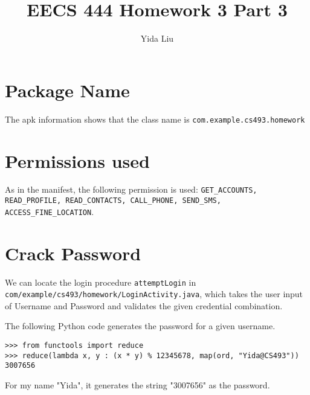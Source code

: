 \documentclass[11pt]{article}
\begin{document}
\author{Yida Liu}
\title{EECS 444 Homework 3 Part 3}
\maketitle


\section{Package Name}

The apk information shows that the class name is \lstinline{com.example.cs493.homework}

\section{Permissions used}

As in the manifest, the following permission is used: \lstinline{GET_ACCOUNTS, READ_PROFILE, READ_CONTACTS, CALL_PHONE, SEND_SMS, ACCESS_FINE_LOCATION}.

\section{Crack Password}

We can locate the login procedure \lstinline{attemptLogin} in \lstinline{com/example/cs493/homework/LoginActivity.java}, which takes the user input of Username and Password and validates the given credential combination.

The following Python code generates the password for a given username.

\begin{lstlisting}
>>> from functools import reduce
>>> reduce(lambda x, y : (x * y) % 12345678, map(ord, "Yida@CS493"))
3007656
\end{lstlisting}

For my name "Yida", it generates the string "3007656" as the password.
\end{document}
